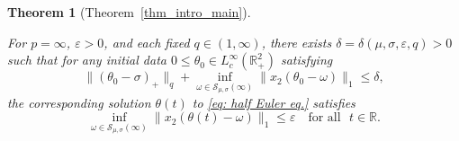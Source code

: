 \documentclass[10pt,a4paper]{amsart}
\newtheorem{theorem}{Theorem}[section]
\theoremstyle{definition}
\theoremstyle{definition}
\numberwithin{equation}{section}
\newcommand{\0}{\emptyset}
\newcommand{\bbR}{\mathbb R}
\newcommand{\calS}{\mathcal S}
\newcommand{\varep}{\varepsilon}
\begin{document}
\begin{theorem}[Theorem~\ref{thm_intro_main}]
\begin{enumerate}[itemsep=1em, topsep=1em]
                    For $p = \infty$, $\varep >0$, and each fixed $q \in (1, \infty)$, there exists $\delta = \delta(\mu, \sigma, \varepsilon, q) > 0$ such that for any initial data $0 \le \theta_0 \in  L_c^{\infty}(\bbR^2_+)$ satisfying
                    \[
                     {\| (\theta_0 - \sigma)_+ \|_q}  +   \inf_{\omega \in \calS_{\mu, \sigma}(\infty)} \| x_2 (\theta_0 - \omega ) \|_1 \le \delta,
                    \]
                    the corresponding solution $\theta(t)$ to 
                    {\eqref{eq: half Euler eq.}}
                    satisfies
                    \[
                    \inf_{\omega \in \calS_{\mu, \sigma}(\infty)} \| x_2(\theta(t) - \omega) \|_1 \le \varepsilon \quad \textrm{for all } \,\, t \in \bbR.
                    \]
                    
				\end{enumerate}
			\end{theorem}
\end{document}
